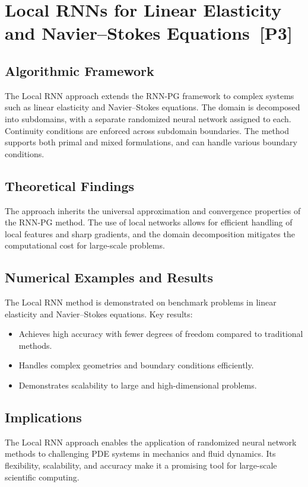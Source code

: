 \documentclass[11pt]{article}
\begin{document}
\section{Local RNNs for Linear Elasticity and Navier–Stokes Equations~[P3]}
\subsection{Algorithmic Framework}
The Local RNN approach extends the RNN-PG framework to complex systems such as linear elasticity and Navier–Stokes equations. The domain is decomposed into subdomains, with a separate randomized neural network assigned to each. Continuity conditions are enforced across subdomain boundaries. The method supports both primal and mixed formulations, and can handle various boundary conditions.

\subsection{Theoretical Findings}
The approach inherits the universal approximation and convergence properties of the RNN-PG method. The use of local networks allows for efficient handling of local features and sharp gradients, and the domain decomposition mitigates the computational cost for large-scale problems.

\subsection{Numerical Examples and Results}
The Local RNN method is demonstrated on benchmark problems in linear elasticity and Navier–Stokes equations. Key results:
\begin{itemize}
    \item Achieves high accuracy with fewer degrees of freedom compared to traditional methods.
    \item Handles complex geometries and boundary conditions efficiently.
    \item Demonstrates scalability to large and high-dimensional problems.
\end{itemize}

\subsection{Implications}
The Local RNN approach enables the application of randomized neural network methods to challenging PDE systems in mechanics and fluid dynamics. Its flexibility, scalability, and accuracy make it a promising tool for large-scale scientific computing.
\end{document}
